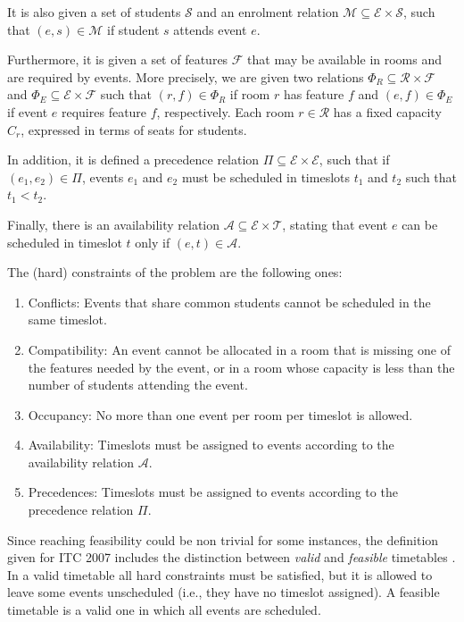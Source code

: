 \documentclass[authoryear,preprint,a4paper,12pt]{elsarticle}
\begin{document}
It is also given a set of students $\mathcal{S}$ and an enrolment
relation $\mathcal{M} \subseteq \mathcal{E} \times \mathcal{S}$, such
that $(e,s)\in \mathcal{M}$ if student $s$ attends event $e$.

Furthermore, it is given a set of features $\mathcal{F}$ that may be
available in rooms and are required by events. More precisely, we are
given two relations $\Phi_R \subseteq \mathcal{R} \times \mathcal{F}$
and $\Phi_E \subseteq \mathcal{E} \times \mathcal{F}$ such that
$(r,f)\in \Phi_R$ if room $r$ has feature $f$ and $(e,f)\in \Phi_E$ if
event $e$ requires feature $f$, respectively. Each room $r\in
\mathcal{R}$ has a fixed capacity $C_r$, expressed in terms of seats
for students.

In addition, it is defined a precedence relation $\Pi \subseteq \mathcal{E} \times
\mathcal{E}$, such that if $(e_1,e_2) \in \Pi$, 
events $e_1$ and $e_2$ must be scheduled in timeslots $t_1$ and $t_2$
such that $t_1 < t_2$.

Finally, there is an availability relation $\mathcal{A} \subseteq \mathcal{E} \times
\mathcal{T}$, stating that event $e$ can be scheduled in timeslot $t$ only if
$(e,t) \in \mathcal{A} $.

The (hard) constraints of the problem are the following
ones:

\begin{enumerate}[H1.]
\item \textsf{Conflicts:} Events that share common students cannot be
  scheduled in the same timeslot.
\item \textsf{Compatibility:} An event cannot be allocated in a room
  that is missing one of the features needed by the event, or in a room
  whose capacity is less than the number of students attending the
  event.
\item \textsf{Occupancy:} No more than one event per room per timeslot
  is allowed.
\item \textsf{Availability:} Timeslots must be assigned to events
  according to the availability relation $\mathcal{A}$.
\item \textsf{Precedences:} Timeslots must be assigned to events
  according to the precedence relation $\Pi$.
\end{enumerate}

Since reaching feasibility could be non trivial for some instances, the definition given for ITC
2007 includes the distinction between \emph{valid} and 
\emph{feasible} timetables \cite[see][]{LePM07}.  In a valid timetable all
hard constraints must be satisfied, but it is allowed to leave some events unscheduled (i.e., they have no timeslot assigned). A feasible
timetable is a valid one in which all events are scheduled.
\end{document}
